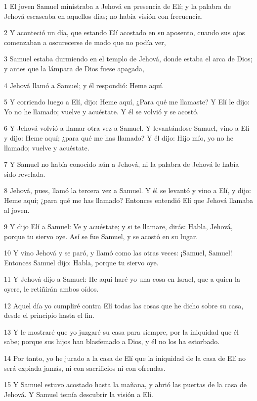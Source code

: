 \par 1 El joven Samuel ministraba a Jehová en presencia de Elí; y la palabra de Jehová escaseaba en aquellos días; no había visión con frecuencia.
\par 2 Y aconteció un día, que estando Elí acostado en su aposento, cuando sus ojos comenzaban a oscurecerse de modo que no podía ver,
\par 3 Samuel estaba durmiendo en el templo de Jehová, donde estaba el arca de Dios; y antes que la lámpara de Dios fuese apagada,
\par 4 Jehová llamó a Samuel; y él respondió: Heme aquí.
\par 5 Y corriendo luego a Elí, dijo: Heme aquí, ¿Para qué me llamaste? Y Elí le dijo: Yo no he llamado; vuelve y acuéstate. Y él se volvió y se acostó.
\par 6 Y Jehová volvió a llamar otra vez a Samuel. Y levantándose Samuel, vino a Elí y dijo: Heme aquí; ¿para qué me has llamado? Y él dijo: Hijo mío, yo no he llamado; vuelve y acuéstate.
\par 7 Y Samuel no había conocido aún a Jehová, ni la palabra de Jehová le había sido revelada.
\par 8 Jehová, pues, llamó la tercera vez a Samuel. Y él se levantó y vino a Elí, y dijo: Heme aquí; ¿para qué me has llamado? Entonces entendió Elí que Jehová llamaba al joven.
\par 9 Y dijo Elí a Samuel: Ve y acuéstate; y si te llamare, dirás: Habla, Jehová, porque tu siervo oye. Así se fue Samuel, y se acostó en su lugar.
\par 10 Y vino Jehová y se paró, y llamó como las otras veces: ¡Samuel, Samuel! Entonces Samuel dijo: Habla, porque tu siervo oye.
\par 11 Y Jehová dijo a Samuel: He aquí haré yo una cosa en Israel, que a quien la oyere, le retiñirán ambos oídos.
\par 12 Aquel día yo cumpliré contra Elí todas las cosas que he dicho sobre su casa, desde el principio hasta el fin.
\par 13 Y le mostraré que yo juzgaré su casa para siempre, por la iniquidad que él sabe; porque sus hijos han blasfemado a Dios, y él no los ha estorbado.
\par 14 Por tanto, yo he jurado a la casa de Elí que la iniquidad de la casa de Elí no será expiada jamás, ni con sacrificios ni con ofrendas.
\par 15 Y Samuel estuvo acostado hasta la mañana, y abrió las puertas de la casa de Jehová. Y Samuel temía descubrir la visión a Elí.
